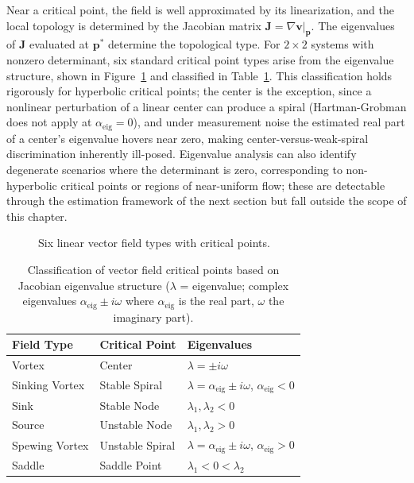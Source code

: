 \documentclass[12pt, letterpaper, oneside]{report}
\begin{document}
Near a critical point, the field is well approximated by its linearization,
and the local topology is determined by the Jacobian matrix
$\mathbf{J}=\nabla\mathbf{v}|_{\mathbf{p}}$. The eigenvalues of $\mathbf{J}$
evaluated at $\mathbf{p}^*$ determine the topological type. For
$2\times2$ systems with nonzero determinant, six standard critical point
types arise from the eigenvalue structure, shown in
Figure~\ref{fig:allfield} and classified in Table~\ref{tab:field_summary}.
This classification holds rigorously for hyperbolic critical points; the
center is the exception, since a nonlinear perturbation of a linear center
can produce a spiral (Hartman-Grobman does not apply at $\alpha_{\text{eig}}=0$),
and under measurement noise the estimated real part of a center's
eigenvalue hovers near zero, making center-versus-weak-spiral discrimination
inherently ill-posed. Eigenvalue analysis can also identify degenerate
scenarios where the determinant is zero, corresponding to non-hyperbolic
critical points or regions of near-uniform flow; these are detectable
through the estimation framework of the next section but fall outside the
scope of this chapter.

\begin{figure}[!t]
\centering
\framebox[0.9\linewidth]{\rule{0pt}{3.0cm}}
\caption{Six linear vector field types with critical points.}
\label{fig:allfield}
\end{figure}

\begin{table}[!t]
\centering
\caption{Classification of vector field critical points based on Jacobian
eigenvalue structure ($\lambda$ = eigenvalue; complex eigenvalues
$\alpha_{\text{eig}}\pm i\omega$ where $\alpha_{\text{eig}}$ is the real
part, $\omega$ the imaginary part).}
\label{tab:field_summary}
\begin{tabular}{lll}
\toprule
\textbf{Field Type} & \textbf{Critical Point} & \textbf{Eigenvalues} \\
\midrule
Vortex & Center & $\lambda=\pm i\omega$ \\
Sinking Vortex & Stable Spiral & $\lambda=\alpha_{\text{eig}}\pm i\omega$, $\alpha_{\text{eig}}<0$ \\
Sink & Stable Node & $\lambda_1,\lambda_2<0$ \\
Source & Unstable Node & $\lambda_1,\lambda_2>0$ \\
Spewing Vortex & Unstable Spiral & $\lambda=\alpha_{\text{eig}}\pm i\omega$, $\alpha_{\text{eig}}>0$ \\
Saddle & Saddle Point & $\lambda_1<0<\lambda_2$ \\
\bottomrule
\end{tabular}
\end{table}
\end{document}
